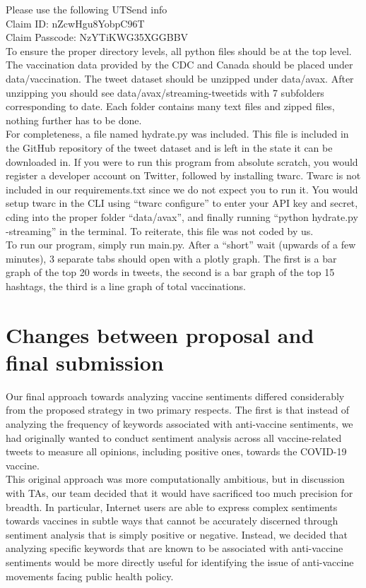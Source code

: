 \documentclass[fontsize=11pt]{article}
\begin{document}
Please use the following UTSend info \\
Claim ID: nZcwHgu8YobpC96T \\
Claim Passcode: NzYTiKWG35XGGBBV \\

To ensure the proper directory levels, all python files should be at the top level. The vaccination data provided by the CDC and Canada should be placed under data/vaccination. The tweet dataset should be unzipped under data/avax. After unzipping you should see data/avax/streaming-tweetids with 7 subfolders corresponding to date. Each folder contains many text files and zipped files, nothing further has to be done. \\

For completeness, a file named hydrate.py was included. This file is included in the GitHub repository of the tweet dataset and is left in the state it can be downloaded in. If you were to run this program from absolute scratch, you would register a developer account on Twitter, followed by installing twarc. Twarc is not included in our requirements.txt since we do not expect you to run it. You would setup twarc in the CLI using “twarc configure” to enter your API key and secret, cding into the proper folder “data/avax”, and finally running “python hydrate.py -streaming” in the terminal. To reiterate, this file was not coded by us.\\

To run our program, simply run main.py. After a “short” wait (upwards of a few minutes), 3 separate tabs should open with a plotly graph. The first is a bar graph of the top 20 words in tweets, the second is a bar graph of the top 15 hashtags, the third is a line graph of total vaccinations.\\

\section*{Changes between proposal and final submission}
Our final approach towards analyzing vaccine sentiments differed considerably from the proposed strategy in two primary respects. The first is that instead of analyzing the frequency of keywords associated with anti-vaccine sentiments, we had originally wanted to conduct sentiment analysis across all vaccine-related tweets to measure all opinions, including positive ones, towards the COVID-19 vaccine. \\

This original approach was more computationally ambitious, but in discussion with TAs, our team decided that it would have sacrificed too much precision for breadth. In particular, Internet users are able to express complex sentiments towards vaccines in subtle ways that cannot be accurately discerned through sentiment analysis that is simply positive or negative. Instead, we decided that analyzing specific keywords that are known to be associated with anti-vaccine sentiments would be more directly useful for identifying the issue of anti-vaccine movements facing public health policy. \\
\end{document}
